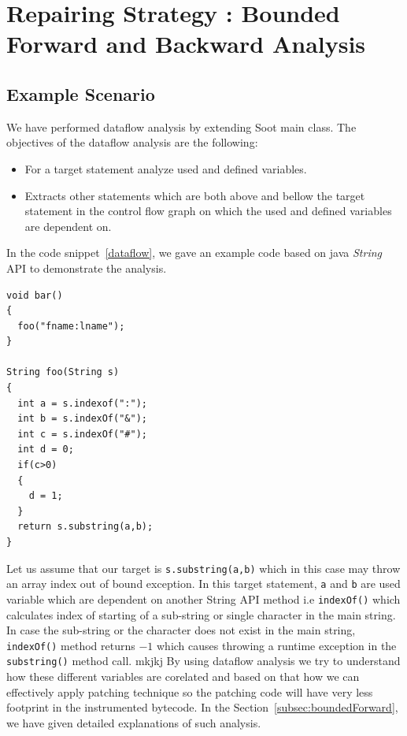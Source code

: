 

\chapter{Repairing Strategy : Bounded Forward and Backward Analysis}
\label{chapter:boundedAnalysis}

\section{Example Scenario}
\label{exampleScenario}

We have performed dataflow analysis by extending Soot main class. The objectives
of the dataflow analysis are the following:

\begin{itemize}
  \item For a target statement analyze used and defined variables.
  
  \item Extracts other statements which are both above and bellow the target
  statement in the control flow graph on which the used and defined variables
  are dependent on.
  
\end{itemize}

In the code snippet~\ref{dataflow}, we gave an example code based on java
\emph{String} API to demonstrate the analysis.

\onehalfspacing
\lstset{language=Java, caption=Dataflow analysis,
label=dataflow}
\begin{lstlisting}
void bar()
{
  foo("fname:lname");
}

String foo(String s)
{
  int a = s.indexof(":");
  int b = s.indexOf("&");
  int c = s.indexOf("#");
  int d = 0;
  if(c>0)
  {
    d = 1;
  }
  return s.substring(a,b);
}

\end{lstlisting}

Let us assume that our target is \texttt{s.substring(a,b)} which in this case
may throw an array index out of bound exception. In this target statement,
\texttt{a} and \texttt{b} are used variable which are dependent on another
String API method i.e \texttt{indexOf()} which calculates index of starting of a
sub-string or single character in the main string. In case the sub-string or the
character does not exist in the main string, \texttt{indexOf()} method returns
$-1$ which causes throwing a runtime exception in the \texttt{substring()}
method call. mkjkj
\newline
By using dataflow analysis we try to understand how these different variables
are corelated and based on that how we can effectively apply patching technique
so the patching code will have very less footprint in the instrumented bytecode.
In the Section~\ref{subsec:boundedForward}, we have given detailed explanations
of such analysis.

